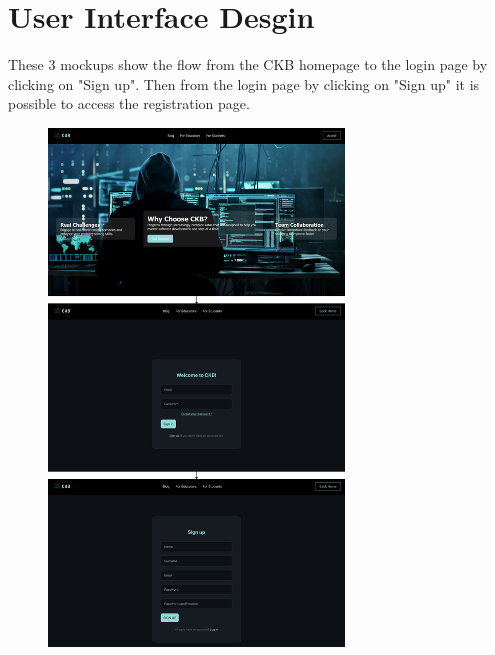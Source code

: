 \section{User Interface Desgin}
These 3 mockups show the flow from the CKB homepage to the login page by clicking on "Sign up". Then from the login page by clicking on "Sign up" it is possible to access the registration page.
\begin{figure}[H]
    \centering
    \includegraphics[width=0.7\textwidth]{Mockup/user_flow_composite_vertical.png}
    \label{fig:enter-label}
\end{figure}
